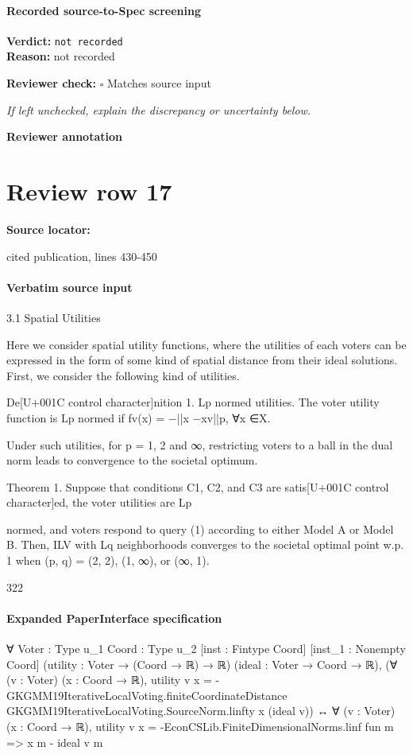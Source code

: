 \documentclass[10pt]{article}
\newcommand{\reviewerbox}{%
  \par\noindent\fbox{\parbox{0.96\linewidth}{\rule{0pt}{0.38in}}}\par
}
\newcommand{\reviewmatch}[1]{%
  \par\noindent\textbf{Reviewer check:} $\square$\; #1\par
  \noindent\emph{If left unchecked, explain the discrepancy or uncertainty below.}\par
}
\begin{document}
\paragraph{Recorded source-to-Spec screening}
\textbf{Verdict:} \texttt{not recorded}
\\
\textbf{Reason:} not recorded
\reviewmatch{Matches source input}
\noindent\textbf{Reviewer annotation}\par
\reviewerbox
\clearpage
\hypertarget{source-claim-0d61cc7c1cd21b16}{}
\section*{Review row 17}
\textbf{Source locator:} {\footnotesize\raggedright cited publication, lines 430-\allowbreak{}450\par}
\paragraph{Verbatim source input}
\begin{ReviewVerbatim}
3.1 Spatial Utilities

Here we consider spatial utility functions, where the utilities of each voters can be expressed
in the form of some kind of spatial distance from their ideal solutions. First, we consider
the following kind of utilities.

De[U+001C control character]nition 1. Lp normed utilities. The voter utility function is Lp normed if fv(x) =
−||x −xv||p, ∀x ∈X.

Under such utilities, for p = 1, 2 and ∞, restricting voters to a ball in the dual norm
leads to convergence to the societal optimum.

Theorem 1. Suppose that conditions C1, C2, and C3 are satis[U+001C control character]ed, the voter utilities are Lp

normed, and voters respond to query (1) according to either Model A or Model B. Then,
ILV with Lq neighborhoods converges to the societal optimal point w.p. 1 when (p, q) = (2, 2),
(1, ∞), or (∞, 1).

322
\end{ReviewVerbatim}


\paragraph{Expanded PaperInterface specification}
\begin{ReviewVerbatim}
∀ {Voter : Type u_1} {Coord : Type u_2} [inst : Fintype Coord] [inst_1 : Nonempty Coord]
  (utility : Voter → (Coord → ℝ) → ℝ) (ideal : Voter → Coord → ℝ),
  (∀ (v : Voter) (x : Coord → ℝ),
      utility v x =
        -GKGMM19IterativeLocalVoting.finiteCoordinateDistance GKGMM19IterativeLocalVoting.SourceNorm.linfty x
            (ideal v)) ↔
    ∀ (v : Voter) (x : Coord → ℝ), utility v x = -EconCSLib.FiniteDimensionalNorms.linf fun m => x m - ideal v m
\end{ReviewVerbatim}
\end{document}

